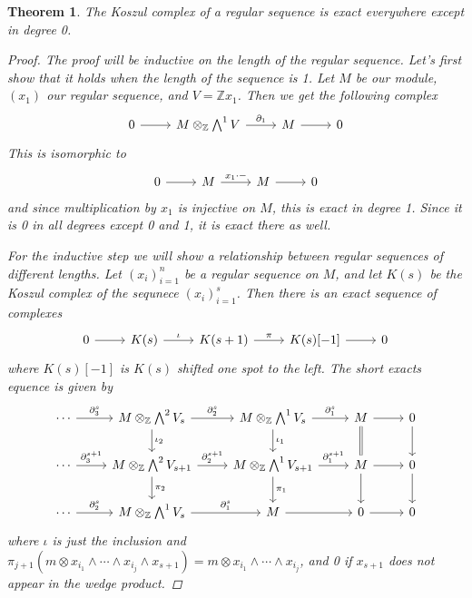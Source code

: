 \documentclass[11pt, a4paper, english]{article}
\numberwithin{prop}{section}
\numberwithin{lemma}{section}
\newtheorem{theorem}{Theorem}
\numberwithin{theorem}{section}
\numberwithin{defin}{section}
\numberwithin{example}{section}
\newcommand{\Z}{\mathbb{Z}}
\begin{document}
\iffalse
\begin{theorem}
The Koszul complex of a regular sequence is exact everywhere except in degree 0.
\begin{proof}
The proof will be inductive on the length of the regular sequence. Let's first show that it holds when the length of the sequence is 1. Let $M$ be our module, $(x_1)$ our regular sequence, and $V = \Z x_1$. Then we get the following complex
\begin{equation*}
\begin{tikzcd}
0 \arrow[r] & M \otimes_\Z \bigwedge^1 V \arrow{r}{\partial_1} & M \arrow[r] & 0
\end{tikzcd}
\end{equation*}
This is isomorphic to 
\begin{equation*}
\begin{tikzcd}
0 \arrow[r] & M\arrow{r}{x_1 \cdot -} & M \arrow[r] & 0
\end{tikzcd}
\end{equation*}
and since multiplication by $x_1$ is injective on $M$, this is exact in degree 1. Since it is 0 in all degrees except 0 and 1, it is exact there as well. 

For the inductive step we will show a relationship between regular sequences of different lengths. Let $(x_i)_{i=1}^{n}$ be a regular sequence on $M$, and let $K(s)$ be the Koszul complex of the sequnece $(x_i)_{i=1}^s$. Then there is an exact sequence of complexes
\begin{equation*}
\begin{tikzcd}
0 \arrow[r] & K(s) \arrow{r}{\iota} & K(s+1) \arrow{r}{\pi} & K(s)[-1] \arrow{r} & 0
\end{tikzcd}
\end{equation*}
where $K(s)[-1]$ is $K(s)$ shifted one spot to the left. The short exacts equence is given by
\begin{equation*}
\begin{tikzcd}
\cdots \arrow{r}{\partial_3^s} & 
M \otimes_\Z \bigwedge^2 V_s \arrow{r}{\partial_2^s} \arrow{d}{\iota_2} & 
M \otimes_\Z \bigwedge^1 V_s \arrow{r}{\partial_1^s} \arrow{d}{\iota_1} & 
M \arrow[r] \arrow[d, equal] & 0 \arrow[d]\\
\cdots \arrow{r}{\partial_3^{s+1}} & 
M \otimes_\Z \bigwedge^2 V_{s+1}\arrow{r}{\partial_2^{s+1}} \arrow{d}{\pi_2} & 
M \otimes_\Z \bigwedge^1 V_{s+1} \arrow{r}{\partial_1^{s+1}} \arrow{d}{\pi_1} & 
M \arrow[r] \arrow[d] &  0 \arrow[d]\\
\cdots \arrow{r}{\partial_2^s} & 
M \otimes_\Z \bigwedge^1 V_s \arrow{r}{\partial_1^s} & 
M \arrow[r] & 0 \arrow[r] & 0
\end{tikzcd}
\end{equation*}
where $\iota$ is just the inclusion and $\pi_{j+1}(m \otimes x_{i_1} \wedge \cdots \wedge x_{i_{j}} \wedge x_{s+1}) = m \otimes x_{i_1} \wedge \cdots \wedge x_{i_{j}}$, and 0 if $x_{s+1}$ does not appear in the wedge product.


\end{proof}
\end{theorem}
\end{document}

